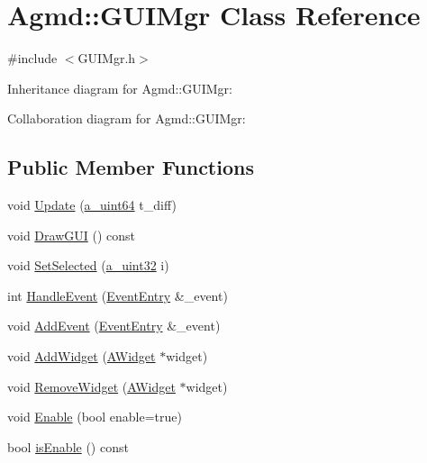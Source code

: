 \hypertarget{class_agmd_1_1_g_u_i_mgr}{\section{Agmd\+:\+:G\+U\+I\+Mgr Class Reference}
\label{class_agmd_1_1_g_u_i_mgr}
}


{\ttfamily \#include $<$G\+U\+I\+Mgr.\+h$>$}



Inheritance diagram for Agmd\+:\+:G\+U\+I\+Mgr\+:


Collaboration diagram for Agmd\+:\+:G\+U\+I\+Mgr\+:
\subsection*{Public Member Functions}
\begin{DoxyCompactItemize}
\item 
void \hyperlink{class_agmd_1_1_g_u_i_mgr_a7155d8cdeb88dd8019143ab6480a3c9e}{Update} (\hyperlink{_common_defines_8h_a6c5192ec3c55d6e5b13d2dbaa082bdea}{a\+\_\+uint64} t\+\_\+diff)
\item 
void \hyperlink{class_agmd_1_1_g_u_i_mgr_af0678a95b5444ad446ddb527ce2645c8}{Draw\+G\+U\+I} () const 
\item 
void \hyperlink{class_agmd_1_1_g_u_i_mgr_ab5bc5a47bf76bf79c199b1690819de7b}{Set\+Selected} (\hyperlink{_common_defines_8h_a964296f9770051b9e4807b1f180dd416}{a\+\_\+uint32} i)
\item 
int \hyperlink{class_agmd_1_1_g_u_i_mgr_a9b687a342289b7a6f8e876abe69bc776}{Handle\+Event} (\hyperlink{struct_agmd_1_1_event_entry}{Event\+Entry} \&\+\_\+event)
\item 
void \hyperlink{class_agmd_1_1_g_u_i_mgr_aa36edc13d8e792777de37b12b0899b6e}{Add\+Event} (\hyperlink{struct_agmd_1_1_event_entry}{Event\+Entry} \&\+\_\+event)
\item 
void \hyperlink{class_agmd_1_1_g_u_i_mgr_a68435e0b3145e490e272d05e1583857b}{Add\+Widget} (\hyperlink{class_agmd_1_1_a_widget}{A\+Widget} $\ast$widget)
\item 
void \hyperlink{class_agmd_1_1_g_u_i_mgr_a487f36882f13c6fb2265d1f19d3e15cd}{Remove\+Widget} (\hyperlink{class_agmd_1_1_a_widget}{A\+Widget} $\ast$widget)
\item 
void \hyperlink{class_agmd_1_1_g_u_i_mgr_af61a60154925c3b07d65b313aaab1f1f}{Enable} (bool enable=true)
\item 
bool \hyperlink{class_agmd_1_1_g_u_i_mgr_aaa2e2b110abc392aa30d7728376326f6}{is\+Enable} () const 
\end{DoxyCompactItemize}
